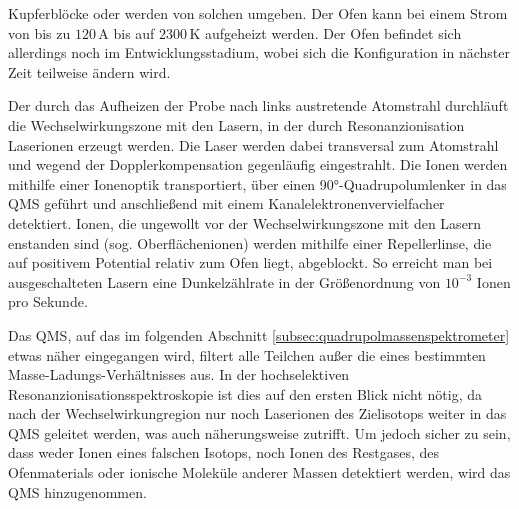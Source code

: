 Kupferblöcke oder werden von solchen umgeben. Der Ofen kann bei einem Strom von
bis zu $120\,$A bis auf $2300\,$K aufgeheizt werden. Der Ofen
befindet sich allerdings noch im Entwicklungsstadium, wobei sich die
Konfiguration in nächster Zeit teilweise ändern wird.\par
Der durch das Aufheizen der Probe nach links austretende Atomstrahl durchläuft
die Wechselwirkungszone mit den Lasern, in der durch Resonanzionisation
Laserionen erzeugt werden. Die Laser werden dabei transversal zum Atomstrahl
und wegend der Dopplerkompensation gegenläufig eingestrahlt. Die Ionen werden
mithilfe einer Ionenoptik transportiert, über einen 90°-Quadrupolumlenker in das
QMS geführt und anschließend mit einem Kanalelektronenvervielfacher detektiert.
Ionen, die ungewollt vor der Wechselwirkungszone mit den Lasern enstanden sind (sog.
Oberflächenionen) werden mithilfe einer Repellerlinse, die auf positivem
Potential relativ zum Ofen liegt, abgeblockt.
So erreicht man bei ausgeschalteten Lasern eine Dunkelzählrate in der
Größenordnung von $10^{-3}$ Ionen pro Sekunde.\par
Das QMS, auf das im folgenden Abschnitt \ref{subsec:quadrupolmassenspektrometer}
etwas näher eingegangen wird, filtert alle Teilchen außer die eines bestimmten
Masse-Ladungs-Verhältnisses aus. In der hochselektiven
Resonanzionisationsspektroskopie ist dies auf den ersten Blick nicht nötig, da nach der Wechselwirkungregion nur noch Laserionen des Zielisotops weiter in das QMS geleitet werden, was auch
näherungsweise zutrifft. Um jedoch sicher zu sein, dass weder Ionen eines
falschen Isotops, noch Ionen des Restgases, des Ofenmaterials oder ionische
Moleküle anderer Massen detektiert werden, wird das QMS hinzugenommen.

